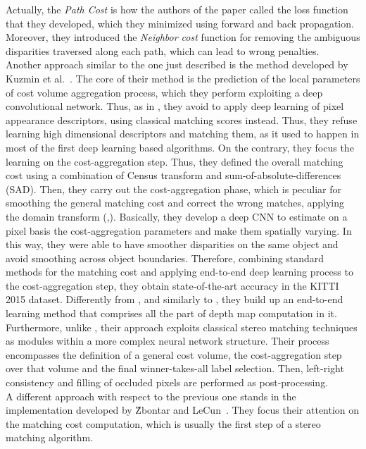 Actually, the \textit{Path Cost} is how the authors of the paper called the loss function that they developed, which they minimized using forward and back propagation.
Moreover, they introduced the \textit{Neighbor cost} function for removing the ambiguous disparities traversed along each path, which can lead to wrong penalties.\\
Another approach similar to the one just described is the method developed by Kuzmin et al.~\cite{Kuzmin2017}. 
The core of their method is the prediction of the local parameters of cost volume aggregation process, which they perform exploiting a deep convolutional network. 
Thus, as in \cite{Seki2017}, they avoid to apply deep learning of pixel appearance descriptors, using classical matching scores instead. 
Thus, they refuse learning high dimensional descriptors and matching them, as it used to happen in most of the first deep learning based algorithms.
On the contrary, they focus the learning on the cost-aggregation step. 
Thus, they defined the overall matching cost using a combination of Census transform and sum-of-absolute-differences (SAD). 
Then, they carry out the cost-aggregation phase, which is peculiar for smoothing the general matching cost and correct the wrong matches, applying the domain transform (\cite{Gastal2011},\cite{Pham2013}).
Basically, they develop a deep CNN to estimate on a pixel basis the cost-aggregation parameters and make them spatially varying. 
In this way, they were able to have smoother disparities on the same object and avoid smoothing across object boundaries. 
Therefore, combining standard methods for the matching cost and applying end-to-end deep learning process to the cost-aggregation step, they obtain state-of-the-art accuracy in the KITTI 2015 dataset. 
Differently from \cite{Zbontar2016}, \cite{Zbontar2015} and similarly to \cite{Mayer2016}, they build up an end-to-end learning method that comprises all the part of depth map computation in it. 
Furthermore, unlike \cite{Mayer2016}, their approach exploits classical stereo matching techniques as modules within a more complex neural network structure. 
Their process encompasses the definition of a general cost volume, the cost-aggregation step over that volume and the final winner-takes-all label selection. 
Then, left-right consistency and filling of occluded pixels are performed as post-processing.\\
A different approach with respect to the previous one stands in the implementation developed by \^{Z}bontar and LeCun~\cite{Zbontar2016}.
They focus their attention on the matching cost computation, which is usually the first step of a stereo matching algorithm. 
